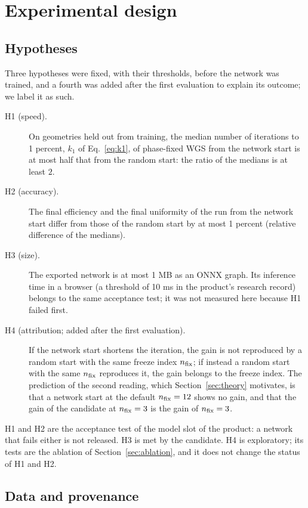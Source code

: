 \section{Experimental design}\label{sec:design}

\subsection{Hypotheses}\label{sec:hypotheses}

Three hypotheses were fixed, with their thresholds, before the network was trained, and a fourth was added after the first evaluation to explain its outcome; we label it as such.
\begin{description}
\item[H1 (speed).] On geometries held out from training, the median number of iterations to 1 percent, $k_1$ of Eq.~\eqref{eq:k1}, of phase-fixed WGS from the network start is at most half that from the random start: the ratio of the medians is at least $2$.
\item[H2 (accuracy).] The final efficiency and the final uniformity of the run from the network start differ from those of the random start by at most 1 percent (relative difference of the medians).
\item[H3 (size).] The exported network is at most 1 MB as an ONNX graph. Its inference time in a browser (a threshold of 10 ms in the product's research record) belongs to the same acceptance test; it was not measured here because H1 failed first.
\item[H4 (attribution; added after the first evaluation).] If the network start shortens the iteration, the gain is not reproduced by a random start with the same freeze index $n_{\mathrm{fix}}$; if instead a random start with the same $n_{\mathrm{fix}}$ reproduces it, the gain belongs to the freeze index. The prediction of the second reading, which Section~\ref{sec:theory} motivates, is that a network start at the default $n_{\mathrm{fix}}=12$ shows no gain, and that the gain of the candidate at $n_{\mathrm{fix}}=3$ is the gain of $n_{\mathrm{fix}}=3$.
\end{description}
H1 and H2 are the acceptance test of the model slot of the product: a network that fails either is not released. H3 is met by the candidate. H4 is exploratory; its tests are the ablation of Section~\ref{sec:ablation}, and it does not change the status of H1 and H2.

\subsection{Data and provenance}\label{sec:data}

